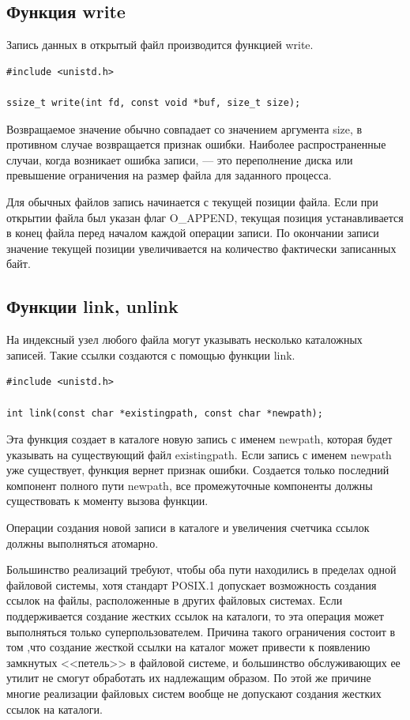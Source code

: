 \subsection{Функция write}

Запись данных в открытый файл производится функцией write.

\begin{lstlisting}[label=code:write,caption=Функция write]
#include <unistd.h>
	
ssize_t write(int fd, const void *buf, size_t size);
\end{lstlisting}

Возвращаемое значение обычно совпадает со значением аргумента size, в противном случае возвращается признак ошибки. Наиболее распространенные случаи, когда возникает ошибка записи, --- это переполнение диска или превышение ограничения на размер файла для заданного процесса.

Для обычных файлов запись начинается с текущей позиции файла. Если при открытии файла был указан флаг O\_APPEND, текущая позиция устанавливается в конец файла перед началом каждой операции записи. По окончании записи значение текущей позиции увеличивается на количество фактически записанных байт.


\subsection{Функции link, unlink}

На индексный узел любого файла могут указывать несколько каталожных записей. Такие ссылки создаются с помощью функции link.

\begin{lstlisting}[label=code:link,caption=Функция link]
#include <unistd.h>

int link(const char *existingpath, const char *newpath);
\end{lstlisting}

Эта функция создает в каталоге новую запись с именем newpath, которая будет указывать на существующий файл existingpath. Если запись с именем newpath уже существует, функция вернет признак ошибки. Создается только последний компонент полного пути newpath, все промежуточные компоненты должны существовать к моменту вызова функции.

Операции создания новой записи в каталоге и увеличения счетчика ссылок должны выполняться атомарно. 

Большинство реализаций требуют, чтобы оба пути находились в пределах одной файловой системы, хотя стандарт POSIX.1 допускает возможность создания ссылок на файлы, расположенные в других файловых системах. Если поддерживается создание жестких ссылок на каталоги, то эта операция может выполняться только суперпользователем. Причина такого ограничения состоит в том ,что создание жесткой ссылки на каталог может привести к появлению замкнутых <<петель>> в файловой системе, и большинство обслуживающих ее утилит не смогут обработать их надлежащим образом. По этой же причине многие реализации файловых систем вообще не допускают создания жестких ссылок на каталоги.

